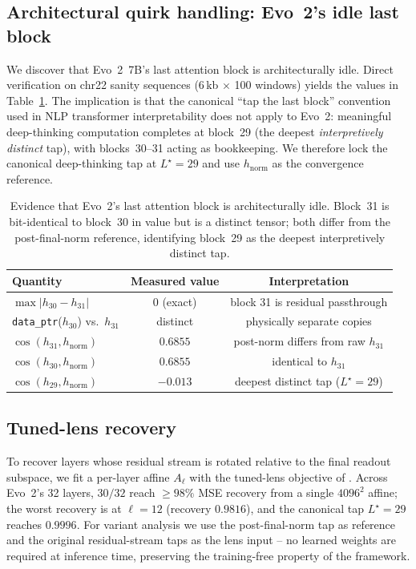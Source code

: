 \documentclass{article}
\theoremstyle{plain}
\theoremstyle{definition}
\theoremstyle{remark}
\newcommand{\hnorm}{h_{\mathrm{norm}}}
\begin{document}
\subsection{Architectural quirk handling: Evo~2's idle last block}
\label{sec:idle-block}

We discover that Evo~2~7B's last attention block is architecturally
idle. Direct verification on chr22 sanity sequences (6\,kb $\times$ 100
windows) yields the values in Table~\ref{tab:idle-block}. The
implication is that the canonical ``tap the last block'' convention
used in NLP transformer interpretability does not apply to Evo~2:
meaningful deep-thinking computation completes at block~29 (the deepest
\emph{interpretively distinct} tap), with blocks~30--31 acting as
bookkeeping. We therefore lock the canonical deep-thinking tap at
$L^{\star}=29$ and use $\hnorm$ as the convergence reference.

\begin{table}[t]
\caption{Evidence that Evo~2's last attention block is architecturally
idle. Block~31 is bit-identical to block~30 in value but is a distinct
tensor; both differ from the post-final-norm reference, identifying
block~29 as the deepest interpretively distinct tap.}
\label{tab:idle-block}
\centering
\small
\begin{tabular}{@{}lcc@{}}
\toprule
Quantity & Measured value & Interpretation \\
\midrule
$\max\bigl|h_{30}-h_{31}\bigr|$ & $0$ (exact) &
   block 31 is residual passthrough \\
\texttt{data\_ptr}($h_{30}$) vs.\ $h_{31}$ & distinct &
   physically separate copies \\
$\cos(h_{31}, \hnorm)$ & $0.6855$ &
   post-norm differs from raw $h_{31}$ \\
$\cos(h_{30}, \hnorm)$ & $0.6855$ &
   identical to $h_{31}$ \\
$\cos(h_{29}, \hnorm)$ & $-0.013$ &
   deepest distinct tap ($L^{\star}=29$) \\
\bottomrule
\end{tabular}
\end{table}

\subsection{Tuned-lens recovery}
\label{sec:tuned-lens}

To recover layers whose residual stream is rotated relative to the
final readout subspace, we fit a per-layer affine $A_{\ell}$ with the
tuned-lens objective of \citet{belrose2023tunedlens}. Across Evo~2's
32 layers, $30/32$ reach $\ge 98\%$ MSE recovery from a single
$4096^{2}$ affine; the worst recovery is at $\ell=12$ (recovery
$0.9816$), and the canonical tap $L^{\star}=29$ reaches $0.9996$. For
variant analysis we use the post-final-norm tap as reference and the
original residual-stream taps as the lens input -- no learned weights
are required at inference time, preserving the training-free property
of the framework.
\end{document}
